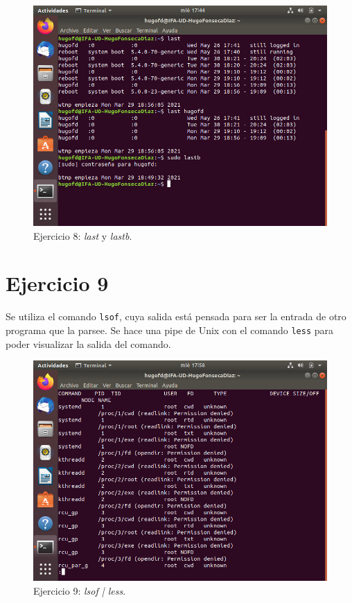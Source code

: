 \documentclass[11pt]{article}
\begin{document}
\begin{figure}[H]
    \caption{Ejercicio 8: \textit{last} y \textit{lastb}.}
  \centering
  \includegraphics[scale=0.7]{e8.png}
\end{figure}

\section{Ejercicio 9}
Se utiliza el comando \verb|lsof|, cuya salida está pensada para ser la entrada de otro programa que la parsee. Se hace una pipe de Unix con el comando \verb|less| para poder visualizar la salida del comando.

\begin{figure}[H]
    \caption{Ejercicio 9: \textit{lsof | less}.}
  \centering
  \includegraphics[scale=0.7]{e9.png}
\end{figure}
\end{document}
